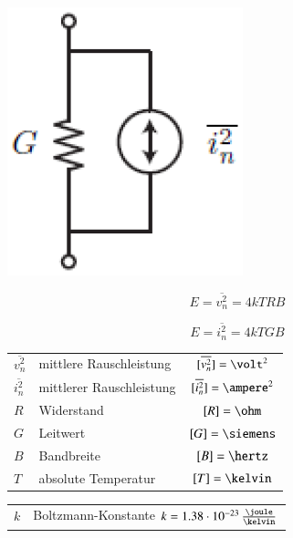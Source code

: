 \begin{minipage}[c]{0.21\columnwidth}
    \includegraphics[width=\columnwidth]{images/rauschquelle_strom.png}
\end{minipage}
\hfill
\begin{minipage}[c]{0.62\columnwidth}
    \begin{minipage}[c]{0.48\columnwidth}
        $$ \boxed{ E = \overline{v_n^2} = 4 k T R B } $$
    \end{minipage}
    \hfill
    \begin{minipage}[c]{0.48\columnwidth}
        $$ \boxed{ E = \overline{i_n^2} = 4 k T G B } $$
    \end{minipage}
    \vspace{0.2cm}

    \begin{tabular}{l l c}
        $\overline{v_n^2}$  & mittlere Rauschleistung   & $[\overline{v_n^2}] = \volt^2$ \\
        $\overline{i_n^2}$  & mittlerer Rauschleistung  & $[\overline{i_n^2}] = \ampere^2$ \\ 
        $R$                 & Widerstand                & $[R] = \ohm$ \\
        $G$                 & Leitwert                  & $[G] = \siemens$ \\
        $B$                 & Bandbreite                & $[B] = \hertz$ \\
        $T$                 & absolute Temperatur       & $[T] = \kelvin$ \\
        \end{tabular}
        \begin{tabular}{ll}
        $k$                 & Boltzmann-Konstante $k = 1.38 \cdot 10^{-23} \, \frac{\joule}{\kelvin}$ \\
    \end{tabular}
\end{minipage}

